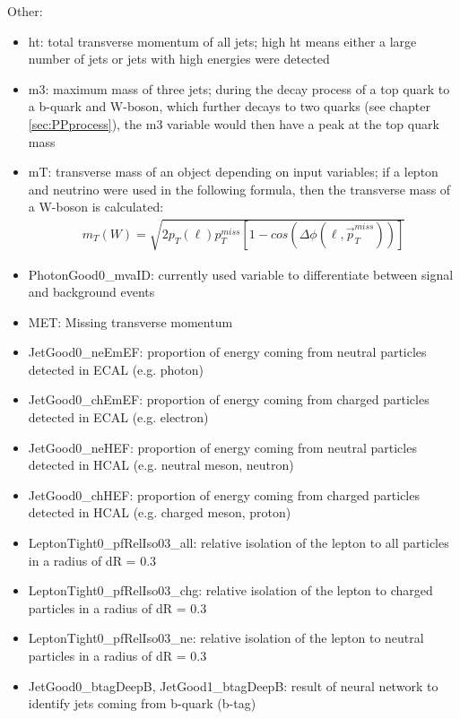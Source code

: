 \documentclass[11pt]{scrartcl}
\begin{document}
Other:
\begin{itemize}
  \item ht: total transverse momentum of all jets; high ht means either a large number of jets or jets with high energies were detected
  \item m3: maximum mass of three jets; during the decay process of a top quark to a b-quark and W-boson, which further decays to two quarks (see chapter \ref{sec:PPprocess}), the m3 variable would then have a peak at the top quark mass  
  \item mT: transverse mass of an object depending on input variables; if a lepton and neutrino were used in the following formula, then the transverse mass of a W-boson is calculated:
	  \begin{align*}
			m_T(W) = \sqrt{2p_T(\ell)p_T^{miss}[1 - cos(\Delta\phi(\ell, \vec{p}_T^{miss}))]}
		\end{align*}
  
  \item PhotonGood0\_mvaID: currently used variable to differentiate between signal and background events
  \item MET: Missing transverse momentum
   		\item JetGood0\_neEmEF: proportion of energy coming from neutral particles detected in ECAL (e.g. photon)
		\item JetGood0\_chEmEF: proportion of energy coming from charged particles detected in ECAL (e.g. electron)
		\item JetGood0\_neHEF: proportion of energy coming from neutral particles detected in HCAL (e.g. neutral meson, neutron)
		\item JetGood0\_chHEF: proportion of energy coming from charged particles detected in HCAL (e.g. charged meson, proton)
  		\item LeptonTight0\_pfRelIso03\_all: relative isolation of the lepton to all particles in a radius of dR = 0.3 %
		\item LeptonTight0\_pfRelIso03\_chg: relative isolation of the lepton to charged particles in a radius of dR = 0.3 %
		\item LeptonTight0\_pfRelIso03\_ne: relative isolation of the lepton to neutral particles in a radius of dR = 0.3 %
		\item JetGood0\_btagDeepB, JetGood1\_btagDeepB: result of neural network to identify jets coming from b-quark (b-tag)
\end{itemize}
\end{document}
